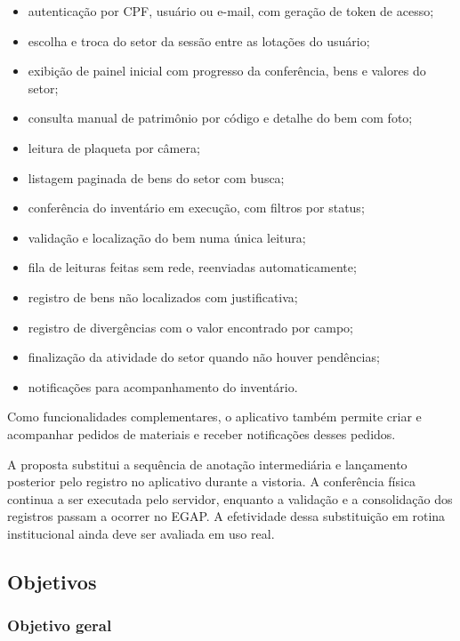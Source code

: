 \documentclass[12pt,a4paper]{article}
\begin{document}
\begin{itemize}
    \item autenticação por CPF, usuário ou e-mail, com geração de token de acesso;
    \item escolha e troca do setor da sessão entre as lotações do usuário;
    \item exibição de painel inicial com progresso da conferência, bens e valores do setor;
    \item consulta manual de patrimônio por código e detalhe do bem com foto;
    \item leitura de plaqueta por câmera;
    \item listagem paginada de bens do setor com busca;
    \item conferência do inventário em execução, com filtros por status;
    \item validação e localização do bem numa única leitura;
    \item fila de leituras feitas sem rede, reenviadas automaticamente;
    \item registro de bens não localizados com justificativa;
    \item registro de divergências com o valor encontrado por campo;
    \item finalização da atividade do setor quando não houver pendências;
    \item notificações para acompanhamento do inventário.
\end{itemize}

Como funcionalidades complementares, o aplicativo também permite criar e acompanhar pedidos de materiais e receber notificações desses pedidos.

A proposta substitui a sequência de anotação intermediária e lançamento posterior pelo registro no aplicativo durante a vistoria. A conferência física continua a ser executada pelo servidor, enquanto a validação e a consolidação dos registros passam a ocorrer no EGAP. A efetividade dessa substituição em rotina institucional ainda deve ser avaliada em uso real.

\subsection{Objetivos}

\subsubsection{Objetivo geral}
\end{document}
